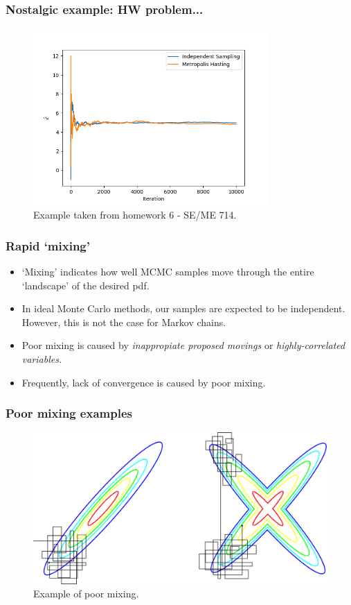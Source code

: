 \documentclass[10pt]{beamer}
\begin{document}
\begin{frame}
	\frametitle{Nostalgic example: HW problem...}
	\begin{figure}[h]
		\centering
		\includegraphics[width=0.8\textwidth]{hw}
		\caption{Example taken from homework 6 - SE/ME 714.}
	\end{figure}	
\end{frame}

\begin{frame}
	\frametitle{Rapid `mixing'}
	\begin{itemize}
		\item `Mixing' indicates how well MCMC samples move through the entire `landscape' of the desired pdf.
		\item In ideal Monte Carlo methods, our samples are expected to be independent. However, this is not the case for Markov chains.
		\item Poor mixing is caused by \textit{inappropiate proposed movings} or \textit{highly-correlated variables.}
		\item Frequently, lack of convergence is caused by poor mixing.
	\end{itemize}
\end{frame}

\begin{frame}
	\frametitle{Poor mixing examples}
	\begin{figure}[h]
		\centering
		\includegraphics[width=\textwidth]{poor_mixing}
		\caption{Example of poor mixing.}
	\end{figure}	
\end{frame}
\end{document}
